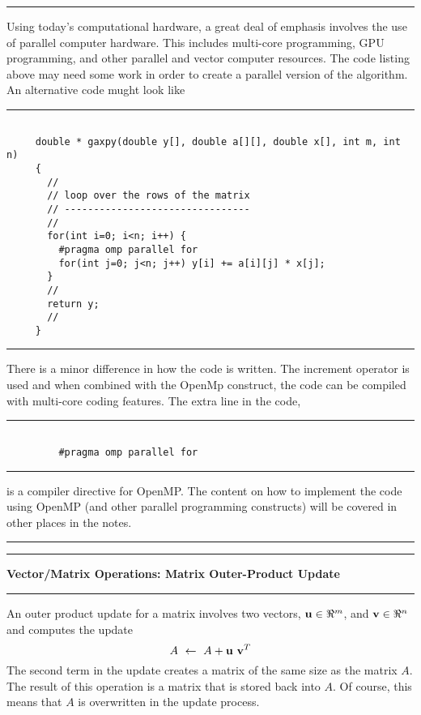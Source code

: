 \documentclass[10pt,fleqn]{article}
\begin{document}
\vskip0.1in\hrule\vskip0.1in
\noindent
Using today's computational hardware, a great deal of emphasis involves the use
of parallel computer hardware. This includes multi-core programming, GPU
programming, and other parallel and vector computer resources. The code listing
above may need some work in order to create a parallel version of the algorithm.
An alternative code mught look like
\vskip0.1in\hrule\vskip0.1in
\begin{verbatim}

     double * gaxpy(double y[], double a[][], double x[], int m, int n)
     {
       //
       // loop over the rows of the matrix
       // --------------------------------
       //
       for(int i=0; i<n; i++) {
         #pragma omp parallel for
         for(int j=0; j<n; j++) y[i] += a[i][j] * x[j];
       }
       //
       return y;
       //
     }

\end{verbatim}
\vskip0.1in\hrule\vskip0.1in
\noindent
There is a minor difference in how the code is written. The increment operator
is used and when combined with the OpenMp construct, the code can be compiled
with multi-core coding features. The extra line in the code,
\vskip0.1in\hrule\vskip0.1in
\begin{verbatim}

         #pragma omp parallel for

\end{verbatim}
\vskip0.1in\hrule\vskip0.1in
\noindent
is a compiler directive for OpenMP. The content on how to implement the code
using OpenMP (and other parallel programming constructs) will be covered in
other places in the notes.
\vskip0.1in\hrule\vskip0.1in
\newpage
\vskip0.1in\hrule\vskip0.1in
\noindent
{\bf Vector/Matrix Operations: Matrix Outer-Product Update}
\vskip0.1in\hrule\vskip0.1in
\noindent
An outer product update for a matrix involves two vectors, ${\bf u}\in\Re^{m}$,
and ${\bf v}\in\Re^{n}$ and computes the update
$$
  A\ \leftarrow\ A + {\bf u}\ {\bf v}^T
$$
The second term in the update creates a matrix of the same size as the matrix
$A$. The result of this operation is a matrix that is stored back into $A$. Of
course, this means that $A$ is overwritten in the update process.
\end{document}
